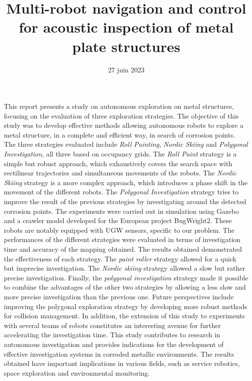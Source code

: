\documentclass[francais,RandD]{rapportPFE}
\title{Multi-robot navigation and control for acoustic inspection of metal plate structures}
\date{27 juin 2023}
\begin{document}
	\maketitle
	\begin{ResumeMotsCles}
		\begin{resumeEn}
			{\scriptsize
				This report presents a study on autonomous exploration on metal structures, focusing on the evaluation of three exploration strategies.
				The objective of this study was to develop effective methods allowing autonomous robots to explore a metal structure, in a complete and efficient way, in search of corrosion points.
				The three strategies evaluated include \textit{Roll Painting}, \textit{Nordic Skiing} and \textit{Polygonal Investigation}, all three based on occupancy grids.
				The \textit{Roll Paint} strategy is a simple but robust approach, which exhaustively covers the search space with rectilinear trajectories and simultaneous movements of the robots.
				The \textit{Nordic Skiing} strategy is a more complex approach, which introduces a phase shift in the movement of the different robots.
				The \textit{Polygonal Investigation} strategy tries to improve the result of the previous strategies by investigating around the detected corrosion points.
				The experiments were carried out in simulation using Gazebo and a crawler model developed for the European project BugWright2.
				These robots are notably equipped with UGW sensors, specific to our problem.
				The performances of the different strategies were evaluated in terms of investigation time and accuracy of the mapping obtained.
				The results obtained demonstrated the effectiveness of each strategy.
				The \textit{paint roller} strategy allowed for a quick but imprecise investigation.
				The \textit{Nordic skiing} strategy allowed a slow but rather precise investigation.
				Finally, the \textit{polygonal investigation} strategy made it possible to combine the advantages of the other two strategies by allowing a less slow and more precise investigation than the previous one.
				Future perspectives include improving the polygonal exploration strategy by developing more robust methods for collision management.
				In addition, the extension of this study to experiments with several teams of robots constitutes an interesting avenue for further accelerating the investigation time.
				This study contributes to research in autonomous investigation and provides indications for the development of effective investigation systems in corroded metallic environments.
				The results obtained have important implications in various fields, such as service robotics, space exploration and environmental monitoring.
}
\end{resumeEn}
\end{ResumeMotsCles}
\end{document}
